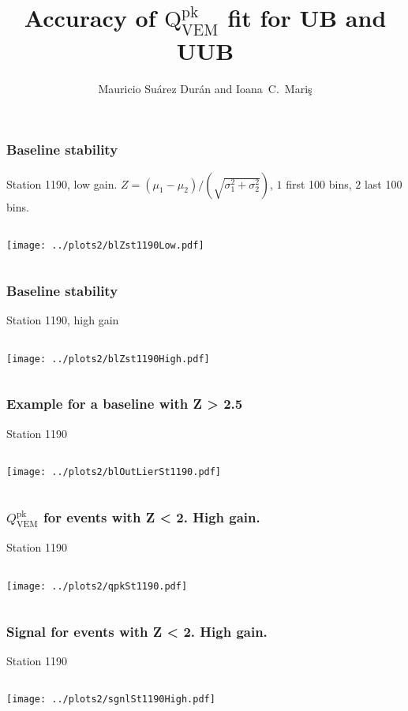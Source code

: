 \documentclass[aspectratio=169]{beamer}
\title{Accuracy of $\mathrm{Q}^{\mathrm{pk}}_{\mathrm{VEM}}$ fit for UB and UUB}
\author{
  Mauricio Su\'arez Dur\'an and Ioana~C.~Mari\c{s}
}
\institute{IIHE-ULB}
\begin{document}
\begin{frame}
  \titlepage
\end{frame}


\begin{frame}
  \frametitle{Baseline stability}
  Station 1190, low gain. $Z=(\mu_1-\mu_2)/\left(\sqrt{\sigma_1^2 +
  \sigma_2^2}\right)$, $1$ first 100 bins, $2$ last 100 bins.
  \vspace{0.1cm}
  \begin{columns}
    \begin{column}{1.\textwidth}
      \texttt{[image: ../plots2/blZst1190Low.pdf]}
    \end{column}
  \end{columns}
\end{frame}

\begin{frame}
  \frametitle{Baseline stability}
  Station 1190, high gain
  \vspace{0.1cm}
  \begin{columns}
    \begin{column}{1.\textwidth}
      \texttt{[image: ../plots2/blZst1190High.pdf]}
    \end{column}
  \end{columns}
\end{frame}

\begin{frame}
  \frametitle{Example for a baseline with Z > 2.5}
  Station 1190
  \vspace{0.1cm}
  \begin{columns}
    \begin{column}{1.\textwidth}
      \texttt{[image: ../plots2/blOutLierSt1190.pdf]}
    \end{column}
  \end{columns}
\end{frame}

\begin{frame}
  \frametitle{$Q^{\mathrm{pk}}_\mathrm{VEM}$ for events with Z <
  2. High gain.}
  Station 1190
  \vspace{0.1cm}
  \begin{columns}
    \begin{column}{1.\textwidth}
      \texttt{[image: ../plots2/qpkSt1190.pdf]}
    \end{column}
  \end{columns}
\end{frame}

\begin{frame}
  \frametitle{Signal for events with Z < 2. High gain.}
  Station 1190
  \vspace{0.1cm}
  \begin{columns}
    \begin{column}{1.\textwidth}
      \texttt{[image: ../plots2/sgnlSt1190High.pdf]}
    \end{column}
  \end{columns}
\end{frame}
\end{document}
